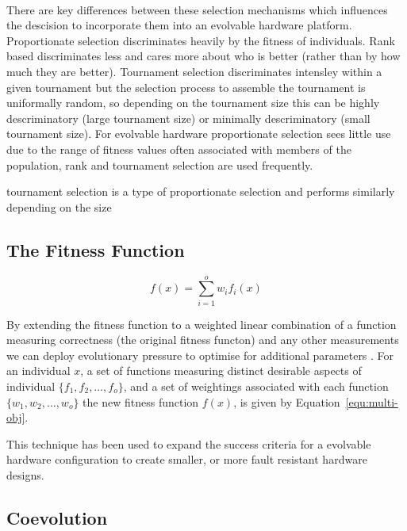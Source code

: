 \paragraph{}
There are key differences between these selection mechanisms which influences
the descision to incorporate them into an evolvable hardware platform. Proportionate
selection discriminates heavily by the fitness of individuals. Rank based
discriminates less and cares more about who is better (rather than by how
much they are better). Tournament selection discriminates intensley within a given
tournament but the selection process to assemble the tournament is uniformally
random, so depending on the tournament size this can be highly descriminatory
(large tournament size) or minimally descriminatory (small tournament size).
For evolvable hardware proportionate selection sees little use due to the range
of fitness values often associated with members of the population, rank and
tournament selection are used frequently.

\todo tournament selection is a type of proportionate selection and performs similarly
depending on the size

\subsection{The Fitness Function}

\begin{equation}
	f(x) = \sum_{i=1}^{o} w_i f_i(x)
	\label{equ:multi-obj}
\end{equation}

By extending the fitness function to a weighted linear combination of a function
measuring correctness (the original fitness functon)
and any other measurements we can deploy evolutionary pressure to optimise for
additional parameters \cite{deJong:2001:RBP:2955239.2955241}. For an individual
$x$, a set of functions measuring distinct desirable aspects of individual
$\{f_1,f_2,\ldots,f_o\}$, and a set of weightings associated with each function
$\{w_1,w_2,\ldots,w_o\}$ the new fitness function $f(x)$, is given by
Equation~\ref{equ:multi-obj}.

This technique has been used to expand the success criteria for a evolvable hardware configuration
to create smaller, or more fault resistant hardware designs.

\subsection{Coevolution}

